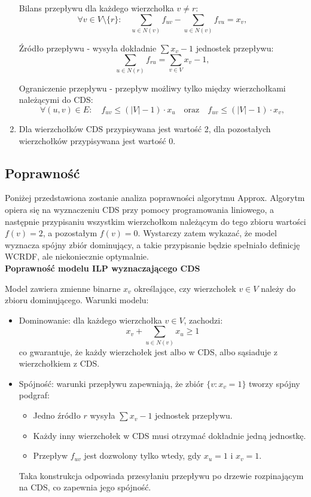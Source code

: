 \begin{enumerate}
        Bilans przepływu dla każdego wierzchołka \( v \neq r \):
        \[
        \forall v \in V \setminus \{r\}:\quad \sum_{u \in N(v)} f_{uv} - \sum_{u \in N(v)} f_{vu} = x_v, \tag{2}
        \]

        Źródło przepływu - wysyła dokładnie \( \sum x_v - 1 \) jednostek przepływu:
        \[
        \sum_{u \in N(r)} f_{ru} = \sum_{v \in V} x_v - 1, \tag{3}
        \]

        Ograniczenie przepływu - przepływ możliwy tylko między wierzchołkami należącymi do CDS:
        \[
        \forall (u, v) \in E:\quad f_{uv} \leq (|V| - 1) \cdot x_u \quad \text{oraz} \quad f_{uv} \leq (|V| - 1) \cdot x_v, \tag{4}
        \]
    \item Dla wierzchołków CDS przypisywana jest wartość 2, dla pozostałych wierzchołków przypisywana jest wartość 0.
\end{enumerate}

\subsection{Poprawność}

Poniżej przedstawiona zostanie analiza poprawności algorytmu Approx. Algorytm opiera się na wyznaczeniu CDS przy pomocy programowania liniowego, a następnie przypisaniu wszystkim wierzchołkom należącym do tego zbioru wartości \( f(v) = 2 \), a pozostałym \( f(v) = 0 \). Wystarczy zatem wykazać, że model wyznacza spójny zbiór dominujący, a takie przypisanie będzie spełniało definicję WCRDF, ale niekoniecznie optymalnie.\\
\textbf{Poprawność modelu ILP wyznaczającego CDS}

Model zawiera zmienne binarne \( x_v \) określające, czy wierzchołek \( v \in V \) należy do zbioru dominującego. Warunki modelu:

\begin{itemize}
    \item Dominowanie: dla każdego wierzchołka \( v \in V \), zachodzi:
    \[
    x_v + \sum_{u \in N(v)} x_u \geq 1
    \]
    co gwarantuje, że każdy wierzchołek jest albo w CDS, albo sąsiaduje z wierzchołkiem z CDS.

    \item Spójność: warunki przepływu zapewniają, że zbiór \( \{v : x_v = 1\} \) tworzy spójny podgraf:
    \begin{itemize}
        \item Jedno źródło  \( r \) wysyła \( \sum x_v - 1 \) jednostek przepływu.
        \item Każdy inny wierzchołek w CDS musi otrzymać dokładnie jedną jednostkę.
        \item Przepływ \( f_{uv} \) jest dozwolony tylko wtedy, gdy \( x_u = 1 \) i \( x_v = 1 \).
    \end{itemize}
    Taka konstrukcja odpowiada przesyłaniu przepływu po drzewie rozpinającym na CDS, co zapewnia jego spójność.
\end{itemize}

